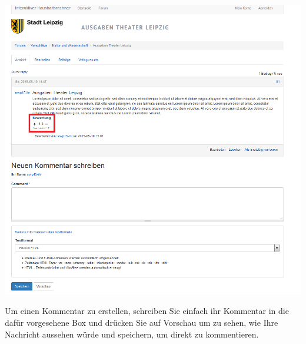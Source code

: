 \documentclass[a4paper,11pt,twoside]{article}
\begin{document}
\begin{center}
  \includegraphics[width=\textwidth]{Bilder/comment.png}
\end{center}
Um einen Kommentar zu erstellen, schreiben Sie einfach ihr Kommentar in die
daf\"ur vorgesehene Box und dr\"ucken Sie auf Vorschau um zu sehen, wie Ihre
Nachricht aussehen w\"urde und speichern, um direkt zu kommentieren.
\end{document}

